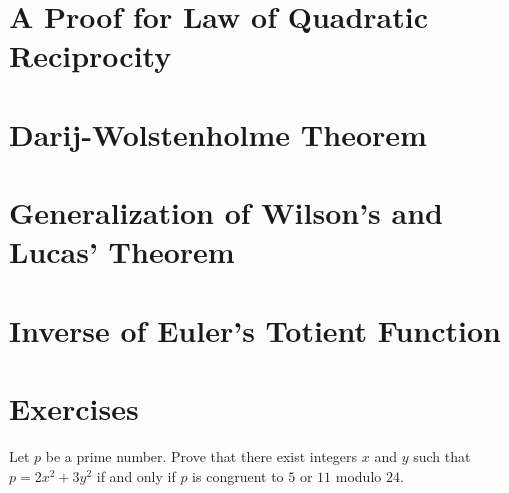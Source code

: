 \documentclass{subfile}
\begin{document}
	\section{A Proof for Law of Quadratic Reciprocity}\label{sec:qrlawproof}
	
	
	\section{Darij-Wolstenholme Theorem}
	
	
	\section{Generalization of Wilson's and Lucas' Theorem}\label{sec:wilsongeneral}
	
	
	\section{Inverse of Euler's Totient Function}
	
	
	\newpage
	\section{Exercises}
	\begin{problem} %
		Let $p$ be a prime number. Prove that there exist integers $x$ and $y$ such that $p=2x^2+3y^2$ if and only if $p$ is congruent to $5$ or $11$ modulo $24$.
	\end{problem}
	
	
\end{document}
